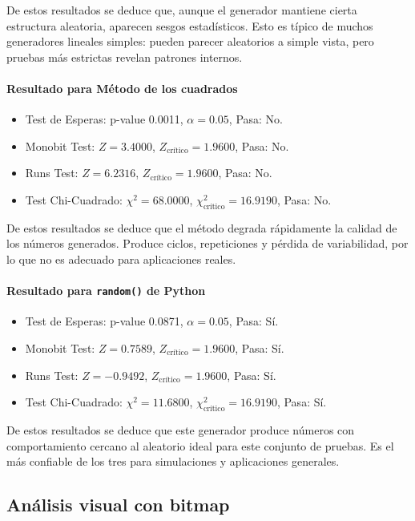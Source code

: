 \documentclass{article}
\begin{document}
De estos resultados se deduce que, aunque el generador mantiene cierta estructura aleatoria, aparecen sesgos estadísticos. Esto es típico de muchos generadores lineales simples: pueden parecer aleatorios a simple vista, pero pruebas más estrictas revelan patrones internos.

\paragraph{Resultado para Método de los cuadrados}

\begin{itemize}
  \item Test de Esperas: p-value 0.0011, $\alpha = 0.05$, Pasa: No.
  \item Monobit Test: $Z = 3.4000$, $Z_{\text{crítico}} = 1.9600$, Pasa: No.
  \item Runs Test: $Z = 6.2316$, $Z_{\text{crítico}} = 1.9600$, Pasa: No.
  \item Test Chi-Cuadrado: $\chi^2 = 68.0000$, $\chi^2_{\text{crítico}} = 16.9190$, Pasa: No.
\end{itemize}

De estos resultados se deduce que el método degrada rápidamente la calidad de los números generados. Produce ciclos, repeticiones y pérdida de variabilidad, por lo que no es adecuado para aplicaciones reales.

\paragraph{Resultado para \texttt{random()} de Python}

\begin{itemize}
  \item Test de Esperas: p-value 0.0871, $\alpha = 0.05$, Pasa: Sí.
  \item Monobit Test: $Z = 0.7589$, $Z_{\text{crítico}} = 1.9600$, Pasa: Sí.
  \item Runs Test: $Z = -0.9492$, $Z_{\text{crítico}} = 1.9600$, Pasa: Sí.
  \item Test Chi-Cuadrado: $\chi^2 = 11.6800$, $\chi^2_{\text{crítico}} = 16.9190$, Pasa: Sí.
\end{itemize}

De estos resultados se deduce que este generador produce números con comportamiento cercano al aleatorio ideal para este conjunto de pruebas. Es el más confiable de los tres para simulaciones y aplicaciones generales.

\subsection{Análisis visual con bitmap}
\end{document}
